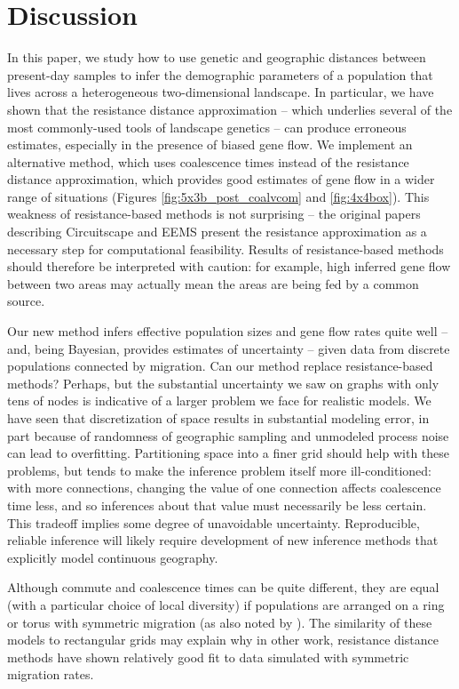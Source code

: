 \documentclass{article}
\begin{document}
\section*{Discussion}

In this paper, we study how to 
use genetic and geographic distances between present-day samples
to infer the demographic parameters of a population that lives across
a heterogeneous two-dimensional landscape.
In particular, we have shown that the resistance distance approximation
-- which underlies several of the most commonly-used tools of landscape genetics --
can produce erroneous estimates, especially in the presence of biased gene flow.
We implement an alternative method, 
which uses coalescence times instead of the resistance distance approximation,
which provides good estimates of gene flow in a wider range of situations
(Figures \ref{fig:5x3b_post_coalvcom} and \ref{fig:4x4box}).
This weakness of resistance-based methods is not surprising --
the original papers 
describing Circuitscape \citep{mcrae2006isolation} and EEMS \citep{petkova2016visualizing}
present the resistance approximation as a necessary step for computational feasibility.
Results of resistance-based methods should therefore be interpreted with caution:
for example, high inferred gene flow between two areas
may actually mean the areas are being fed by a common source.

Our new method infers effective population sizes and gene flow rates quite well 
-- and, being Bayesian, provides estimates of uncertainty --
given data from discrete populations connected by migration.
Can our method replace resistance-based methods?
Perhaps, but
the substantial uncertainty we saw on graphs with only tens of nodes
is indicative of a larger problem we face for realistic models.
We have seen that discretization of space results in substantial modeling error,
in part because of randomness of geographic sampling
and unmodeled process noise can lead to overfitting.
Partitioning space into a finer grid should help with these problems,
but tends to make the inference problem itself more ill-conditioned:
with more connections,
changing the value of one connection affects coalescence time less,
and so inferences about that value must necessarily be less certain.
This tradeoff implies some degree of unavoidable uncertainty.
Reproducible, reliable inference will likely require development of new inference methods
that explicitly model continuous geography.


Although commute and coalescence times can be quite different,
they are equal (with a particular choice of local diversity)
if populations are arranged on a ring or torus
with symmetric migration
(as also noted by \citet{mcrae2006isolation}).
The similarity of these models to rectangular grids
may explain why in other work, resistance distance methods have shown relatively good fit to data
simulated with symmetric migration rates.
\end{document}
